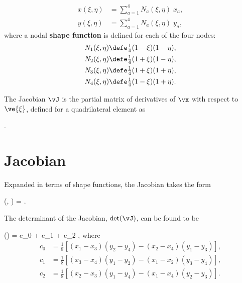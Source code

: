 \documentclass[11pt, oneside]{article}   	%
\begin{document}
\begin{align}
  x(\xi,\eta) & = \sum_{a=1}^4 N_a(\xi, \eta) \; x_a, \\
  y(\xi,\eta) & = \sum_{a=1}^4 N_a(\xi, \eta) \; y_a, 
\end{align}
where a nodal {\bf shape function} is defined for each of the four nodes:
\begin{align}
  N_1(\xi, \eta) & \defe \tfrac{1}{4} (1 - \xi) (1 - \eta), \\
  N_2(\xi, \eta) & \defe \tfrac{1}{4} (1 + \xi) (1 - \eta), \\
  N_3(\xi, \eta) & \defe \tfrac{1}{4} (1 + \xi) (1 + \eta), \\
  N_4(\xi, \eta) & \defe \tfrac{1}{4} (1 - \xi) (1 + \eta).
\end{align}

The Jacobian $\vJ$ is the partial matrix of derivatives of $\vx$ with 
respect to $\ve{\xi}$, defined for a quadrilateral element as

\be 
 \vJ {} {}.
\ee 

\section{Jacobian}

Expanded in terms of shape functions, the Jacobian takes the form 

\be 
 \vJ(\xi, \eta) =  
  \left[ 
  \begin{tabular}{cc}
    $x_1$ & $y_1$ \\
    $x_2$ & $y_2$ \\
    $x_3$ & $y_3$ \\
    $x_4$ & $y_4$ \\
  \end{tabular}
  \right].
\ee 

The determinant of the Jacobian, $\det(\vJ)$, can be found to be 

\be 
\det(\vJ) = c_0 + c_1 \xi + c_2 \eta,
\ee 
where
\begin{align}
  c_0 & = \frac{1}{8} \left[(x_1 - x_3) (y_2 - y_4) - (x_2 - x_4) (y_1 - y_3) \right], \\
  c_1 & = \frac{1}{8} \left[(x_3 - x_4) (y_1 - y_2) - (x_1 - x_2) (y_3 - y_4) \right], \\
  c_2 & = \frac{1}{8} \left[(x_2 - x_3) (y_1 - y_4) - (x_1 - x_4) (y_2 - y_3) \right].
\end{align}
\end{document}
